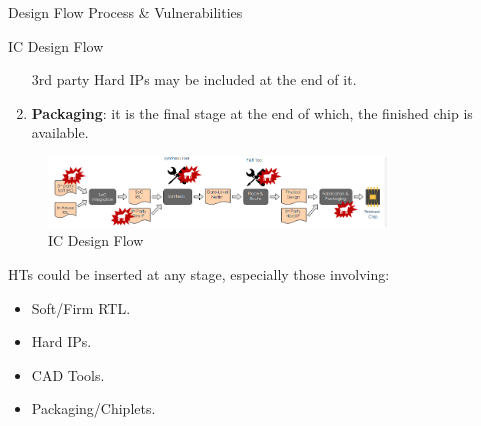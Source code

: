 \begin{section}{Design Flow Process \& Vulnerabilities}
\begin{subsection}{IC Design Flow}
\begin{enumerate}
        3rd party Hard IPs may be included at the end of it.
      \item \textbf{Packaging}: it is the final stage at the end of which, the finished chip is
        available.
    \end{enumerate}
    \begin{figure}[H]
      \centering
      \includegraphics[width=0.8\textwidth]{img/hardware/ic design flow trojan.png}
      \caption{IC Design Flow}
      \label{fig:hw-trojan-design-flow}
    \end{figure}
     HTs could be inserted at any stage, especially those involving:
     \begin{itemize}
       \item Soft/Firm RTL.
       \item Hard IPs.
       \item CAD Tools.
       \item Packaging/Chiplets.
     \end{itemize}


\end{subsection}
\end{section}
